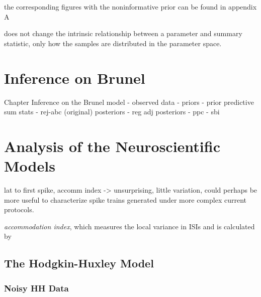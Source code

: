 the corresponding figures with the noninformative prior can be found in appendix A

does not change the intrinsic relationship between a parameter and summary statistic, only how the samples are distributed in the parameter space. 




\chapter{Inference on Brunel}\label{chap:res_brunel}

Chapter Inference on the Brunel model
- observed data 
- priors
- prior predictive sum stats 
- rej-abc (original) posteriors 
- reg adj posteriors
- ppc 
- sbi



\chapter{Analysis of the Neuroscientific Models}

lat to first spike, accomm index -> unsurprising, little variation, could perhaps be more useful to characterize spike trains generated under more complex current protocols. 




\textit{accommodation index}, which measures the local variance in ISIs and is calculated by


\section{The Hodgkin-Huxley Model}




\subsection{Noisy HH Data}

